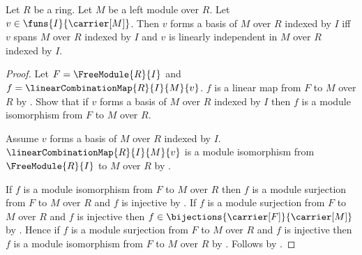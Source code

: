 \begin{theorem}\label{indexed_module_basis_iff}
    Let $R$ be a ring.
    Let $M$ be a left module over $R$.
    Let $v\in\funs{I}{\carrier[M]}$.
    Then $v$ forms a basis of $M$ over $R$ indexed by $I$ iff
        $v$ spans $M$ over $R$ indexed by $I$ and
        $v$ is linearly independent in $M$ over $R$ indexed by $I$.
\end{theorem}
\begin{proof}
    Let $F=\FreeModule{R}{I}$ and
        $f=\linearCombinationMap{R}{I}{M}{v}$.
    $f$ is a linear map from $F$ to $M$ over $R$ by
        .
    Show that if $v$ forms a basis of $M$ over $R$ indexed by $I$ then
        $f$ is a module isomorphism from $F$ to $M$ over $R$.
    \begin{subproof}
        Assume $v$ forms a basis of $M$ over $R$ indexed by $I$.
        $\linearCombinationMap{R}{I}{M}{v}$ is a module isomorphism from
            $\FreeModule{R}{I}$ to $M$ over $R$ by
            .
    \end{subproof}
    If $f$ is a module isomorphism from $F$ to $M$ over $R$ then
        $f$ is a module surjection from $F$ to $M$ over $R$ and
        $f$ is injective by
        .
    If $f$ is a module surjection from $F$ to $M$ over $R$ and
        $f$ is injective then
        $f\in\bijections{\carrier[F]}{\carrier[M]}$ by
        .
    Hence if $f$ is a module surjection from $F$ to $M$ over $R$ and
        $f$ is injective then
        $f$ is a module isomorphism from $F$ to $M$ over $R$ by
        .
    Follows by
        .
\end{proof}


